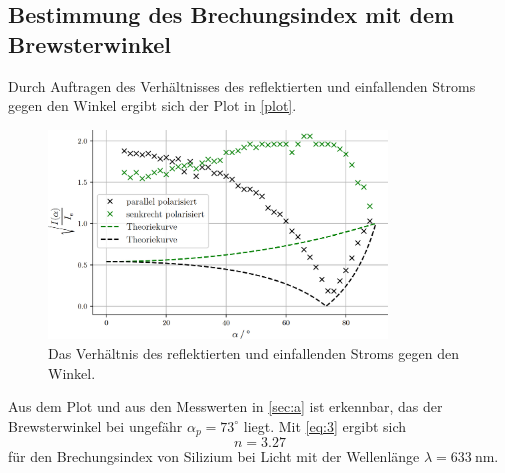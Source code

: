 \subsection{Bestimmung des Brechungsindex mit dem Brewsterwinkel}
Durch Auftragen des Verhältnisses des reflektierten und einfallenden Stroms gegen den Winkel ergibt sich der Plot in \autoref{plot}.
\begin{figure}[H]
  \centering
  \includegraphics[width=9cm]{plot}
  \caption{Das Verhältnis des reflektierten und einfallenden Stroms gegen den Winkel.}
  \label{plot}
\end{figure}
Aus dem Plot und aus den Messwerten in \autoref{sec:a} ist erkennbar, das der Brewsterwinkel bei ungefähr $\alpha_p=73^\circ$ liegt. Mit \eqref{eq:3} ergibt sich 
\begin{equation*}
  n=3.27
\end{equation*}
für den Brechungsindex von Silizium bei Licht mit der Wellenlänge $\lambda=633\ \textrm{nm}$.
